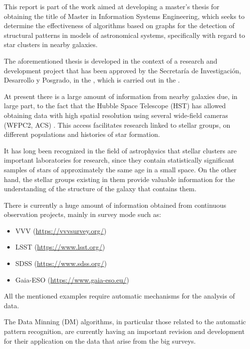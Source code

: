 \ifdefined\ingles	
	This report is part of the work aimed at developing a master's thesis for obtaining the title of Master in Information Systems Engineering, which seeks to determine the effectiveness of algorithms based on graphs for the detection of structural patterns in models of astronomical systems, specifically with regard to star clusters in nearby galaxies.
	
	The aforementioned thesis is developed in the context of a research and development project that has been approved by the Secretaría de Investigación, Desarrollo y Posgrado, in the \utn, which is carried out in the \cids.
	
	At present there is a large amount of information from nearby galaxies due, in large part, to the fact that the Hubble Space Telescope (HST) has allowed obtaining data with high spatial resolution using several wide-field cameras (WFPC2, ACS) \cite{dalcanton2009acs}. This access facilitates research linked to stellar groups, on different populations and histories of star formation.
	
	It has long been recognized in the field of astrophysics that stellar clusters are important laboratories for research, since they contain statistically significant samples of stars of approximately the same age in a small space. On the other hand, the stellar groups existing in them provide valuable information for the understanding of the structure of the galaxy that contains them.
	
	There is currently a huge amount of information obtained from continuous observation projects, mainly in survey mode\cite{borne2008scientific, frinchaboy2012sdss} such as:
	
	\begin{itemize}
		\item VVV\cite{minniti2010vista} (\url{https://vvvsurvey.org/})
		\item LSST\cite{ivezic2007astrometry} (\url{https://www.lsst.org/})
		\item SDSS\cite{bundy2014overview} (\url{https://www.sdss.org/})
		\item Gaia-ESO\cite{gilmore2012gaia} (\url{https://www.gaia-eso.eu/})
	\end{itemize}

	All the mentioned examples require automatic mechanisms for the analysis of data.

	The Data Minning (DM) algorithms, in particular those related to the automatic pattern recognition, are currently having an important revision and development\cite {borne2009astroinformatics, ball2010data, schmeja2011identifying} for their application on the data that arise from the big surveys.
	
